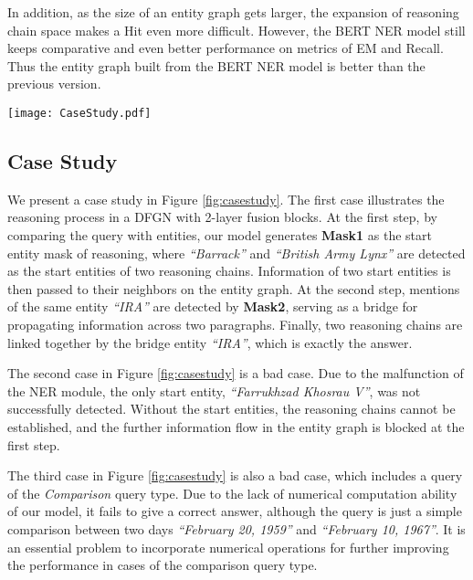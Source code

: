 \documentclass[11pt,a4paper]{article}
\begin{document}
In addition, as the size of an entity graph gets larger, the expansion of reasoning chain space makes a Hit even more difficult. However, the BERT NER model still keeps comparative and even better performance on metrics of EM and Recall.
Thus the entity graph built from the BERT NER model is better than the previous version.



\begin{figure*}[t]
\begin{center}
\texttt{[image: CaseStudy.pdf]}
\end{center}
\caption{Case study of three samples in the development set. We train a DFGN with 2-layer fusion blocks to produce the results. The numbers on the left side indicate the importance scores of the predicted masks. The text on the right side include the queries, answers, predictions, predicted top-1 reasoning chains and the supporting facts of three samples with the recognized entities highlighted by different colors.}
\label{fig:casestudy}
\end{figure*}

\subsection{Case Study}
We present a case study in Figure \ref{fig:casestudy}.
The first case illustrates the reasoning process in a DFGN with 2-layer fusion blocks. At the first step, by comparing the query with entities, our model generates \textbf{Mask1} as the start entity mask of reasoning, where \textit{``Barrack''} and \textit{``British Army Lynx''} are detected as the start entities of two reasoning chains. Information of two start entities is then passed to their neighbors on the entity graph. At the second step, mentions of the same entity \textit{``IRA''} are detected by \textbf{Mask2}, serving as a bridge for propagating information across two paragraphs. Finally, two reasoning chains are linked together by the bridge entity \textit{``IRA''}, which is exactly the answer.

The second case in Figure \ref{fig:casestudy} is a bad case. Due to the malfunction of the NER module, the only start entity, \textit{``Farrukhzad Khosrau V''}, was not successfully detected. Without the start entities, the reasoning chains cannot be established, and the further information flow in the entity graph is blocked at the first step.

The third case in Figure \ref{fig:casestudy} is also a bad case, which includes a query of the \textit{Comparison} query type. Due to the lack of numerical computation ability of our model, it fails to give a correct answer, although the query is just a simple comparison between two days \textit{``February 20, 1959''} and \textit{``February 10, 1967''}. It is an essential problem to incorporate numerical operations for further improving the performance in cases of the comparison query type. 
\end{document}
